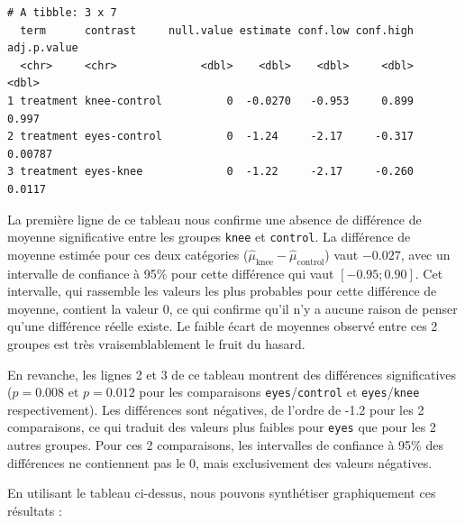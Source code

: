 \documentclass[
  a4paper,
]{article}
\newenvironment{Shaded}{\begin{snugshade}}{\end{snugshade}}
\newcommand{\DataTypeTok}[1]{\textcolor[rgb]{0.00,0.34,0.68}{#1}}
\newcommand{\DecValTok}[1]{\textcolor[rgb]{0.69,0.50,0.00}{#1}}
\newcommand{\KeywordTok}[1]{\textcolor[rgb]{0.12,0.11,0.11}{\textbf{#1}}}
\newcommand{\NormalTok}[1]{\textcolor[rgb]{0.12,0.11,0.11}{#1}}
\newcommand{\OperatorTok}[1]{\textcolor[rgb]{0.12,0.11,0.11}{#1}}
\newcommand{\StringTok}[1]{\textcolor[rgb]{0.75,0.01,0.01}{#1}}
\begin{document}
\begin{verbatim}
# A tibble: 3 x 7
  term      contrast     null.value estimate conf.low conf.high adj.p.value
  <chr>     <chr>             <dbl>    <dbl>    <dbl>     <dbl>       <dbl>
1 treatment knee-control          0  -0.0270   -0.953     0.899     0.997  
2 treatment eyes-control          0  -1.24     -2.17     -0.317     0.00787
3 treatment eyes-knee             0  -1.22     -2.17     -0.260     0.0117 
\end{verbatim}

La première ligne de ce tableau nous confirme une absence de différence de moyenne significative entre les groupes \texttt{knee} et \texttt{control}. La différence de moyenne estimée pour ces deux catégories (\(\hat{\mu}_{\textrm{knee}} - \hat{\mu}_{\textrm{control}}\)) vaut \(-0.027\), avec un intervalle de confiance à 95\% pour cette différence qui vaut \([-0.95 ; 0.90]\). Cet intervalle, qui rassemble les valeurs les plus probables pour cette différence de moyenne, contient la valeur 0, ce qui confirme qu'il n'y a aucune raison de penser qu'une différence réelle existe. Le faible écart de moyennes observé entre ces 2 groupes est très vraisemblablement le fruit du hasard.

En revanche, les lignes 2 et 3 de ce tableau montrent des différences significatives (\(p = 0.008\) et \(p = 0.012\) pour les comparaisons \texttt{eyes}/\texttt{control} et \texttt{eyes}/\texttt{knee} respectivement). Les différences sont négatives, de l'ordre de -1.2 pour les 2 comparaisons, ce qui traduit des valeurs plus faibles pour \texttt{eyes} que pour les 2 autres groupes. Pour ces 2 comparaisons, les intervalles de confiance à 95\% des différences ne contiennent pas le 0, mais exclusivement des valeurs négatives.

En utilisant le tableau ci-dessus, nous pouvons synthétiser graphiquement ces résultats :

\begin{Shaded}
\end{Shaded}
\end{document}
